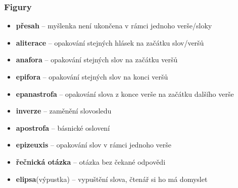 \subsubsection{Figury}
\begin{itemize}
\item[] \textbf{přesah} -- myšlenka není ukončena v rámci jednoho verše/sloky
\item[] \textbf{aliterace} -- opakování stejných hlásek na začátku slov/veršů
\item[] \textbf{anafora} -- opakování stejných slov na začátku veršů
\item[] \textbf{epifora} -- opakování stejných slov na konci veršů
\item[] \textbf{epanastrofa} -- opakování slova z konce verše na začátku dalšího verše
\item[] \textbf{inverze} -- zaměnění slovosledu
\item[] \textbf{apostrofa} -- básnické oslovení
\item[] \textbf{epizeuxis} -- opakování slov v rámci jednoho verše
\item[] \textbf{řečnická otázka} -- otázka bez čekané odpovědi
\item[] \textbf{elipsa}(výpustka) -- vypuštění slova, čtenář si ho má domyslet
\end{itemize}

